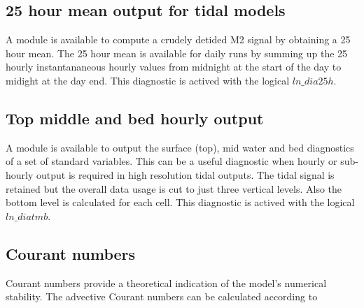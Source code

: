 \documentclass[../main/NEMO_manual]{subfiles}
\begin{document}
\begin{listing}
  \caption{}
  \label{lst:namptr}
\end{listing}

\subsection{25 hour mean output for tidal models}

\begin{listing}
  \caption{}
  \label{lst:nam_dia25h}
\end{listing}

A module is available to compute a crudely detided M2 signal by obtaining a 25 hour mean.
The 25 hour mean is available for daily runs by summing up the 25 hourly instantananeous hourly values from
midnight at the start of the day to midight at the day end.
This diagnostic is actived with the logical $ln\_dia25h$.

\subsection{Top middle and bed hourly output}

\begin{listing}
  \caption{}
  \label{lst:nam_diatmb}
\end{listing}

A module is available to output the surface (top), mid water and bed diagnostics of a set of standard variables.
This can be a useful diagnostic when hourly or sub-hourly output is required in high resolution tidal outputs.
The tidal signal is retained but the overall data usage is cut to just three vertical levels.
Also the bottom level is calculated for each cell.
This diagnostic is actived with the logical $ln\_diatmb$.

\subsection{Courant numbers}

Courant numbers provide a theoretical indication of the model's numerical stability.
The advective Courant numbers can be calculated according to
\end{document}
